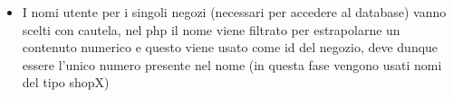 \begin{itemize}
\item I nomi utente per i singoli negozi (necessari per accedere al database) vanno scelti con cautela, nel php il nome viene filtrato per estrapolarne un contenuto numerico e questo viene usato come id del negozio, deve dunque essere l'unico numero presente nel nome (in questa fase vengono usati nomi del tipo shopX)
\end{itemize}
